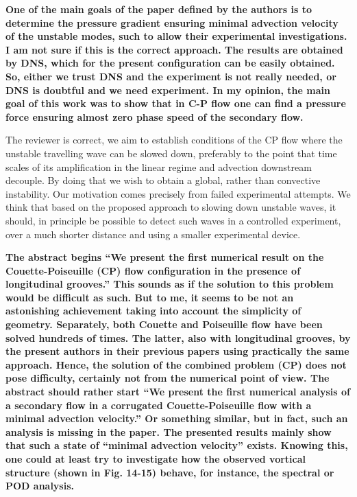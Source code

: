 \documentclass[a4paper,12pt]{article}
\begin{document}
{\bf One of the main goals of the paper defined by the authors is to determine the pressure gradient ensuring minimal advection velocity of the unstable modes, such to allow their experimental investigations. I am not sure if this is the correct approach. The results are obtained by DNS, which for the present configuration can be easily obtained. So, either we trust DNS and the experiment is not really needed, or DNS is doubtful and we need experiment. In my opinion, the main goal of this work was to show that in C-P flow one can find a pressure force ensuring almost zero phase speed of the secondary flow.}

\vspace*{20pt}
The reviewer is correct, we aim to establish conditions of the CP flow where the unstable travelling wave can be slowed down, preferably to the point that time scales of its amplification in the linear regime and advection downstream decouple. By doing that we wish to obtain a global, rather than convective instability. Our motivation comes precisely from failed experimental attempts. We think that based on the proposed approach to slowing down unstable waves, it should, in principle be possible to detect such waves in a controlled experiment, over a much shorter distance and using a smaller experimental device. 
\vspace*{20pt}

{\bf The abstract begins “We present the first numerical result on the Couette-Poiseuille (CP) flow configuration in the presence of longitudinal grooves.” This sounds as if the solution to this problem would be difficult as such. But to me, it seems to be not an astonishing achievement taking into account the simplicity of geometry. Separately, both Couette and Poiseuille flow have been solved hundreds of times. The latter, also with longitudinal grooves, by the present authors in their previous papers using practically the same approach. Hence, the solution of the combined problem (CP) does not pose difficulty, certainly not from the numerical point of view. The abstract should rather start “We present the first numerical analysis of a secondary flow in a corrugated Couette-Poiseuille flow with a minimal advection velocity.” Or something similar, but in fact, such an analysis is missing in the paper. The presented results mainly show that such a state of “minimal advection velocity” exists. Knowing this, one could at least try to investigate how the observed vortical structure (shown in Fig. 14-15) behave, for instance, the spectral or POD analysis.}
\end{document}

